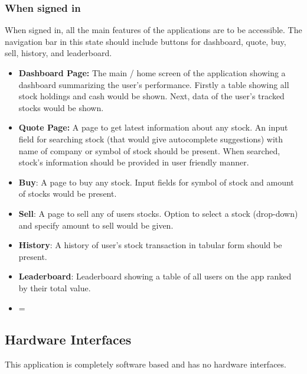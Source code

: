 \documentclass[12 pt, a4paper]{report}
\begin{document}
	\subsubsection{When signed in}
	When signed in, all the main features of the applications are to be accessible. The navigation bar in this state should include buttons for dashboard, quote, buy, sell, history, and leaderboard.
	\begin{itemize}
		\item \textbf{Dashboard Page:} The main / home screen of the application showing a dashboard summarizing the user's performance. Firstly a table showing all stock holdings and cash would be shown. Next, data of the user's tracked stocks would  be shown.
		\item \textbf{Quote Page: } A page to get latest information about any stock. An input field for searching stock (that would give autocomplete suggestions) with name of company or symbol of stock should be present. When searched, stock's information should be provided in user friendly manner.
		\item \textbf{Buy}: A page to buy any stock. Input fields for symbol of stock and amount of stocks would be present.
		\item \textbf{Sell}: A page to sell any of users stocks. Option to select a stock (drop-down) and specify amount to sell would be given.
		\item \textbf{History}: A history of user's stock transaction in tabular form should be present.
		\item \textbf{Leaderboard}: Leaderboard showing a table of all users on the app ranked by their total value.
		\item=
	\end{itemize}
	
	\subsection {Hardware Interfaces}
	This application is completely software based and has no hardware interfaces.
	
\end{document}
